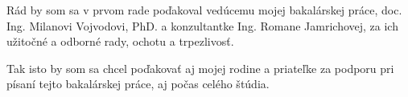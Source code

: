 Rád by som sa v prvom rade poďakoval vedúcemu mojej bakalárskej práce, doc. Ing. Milanovi Vojvodovi, PhD. a konzultantke Ing. Romane Jamrichovej, za ich užitočné a odborné rady, ochotu a trpezlivosť. 

Tak isto by som sa chcel poďakovať aj mojej rodine a priateľke za podporu pri písaní tejto bakalárskej práce, aj počas celého štúdia.